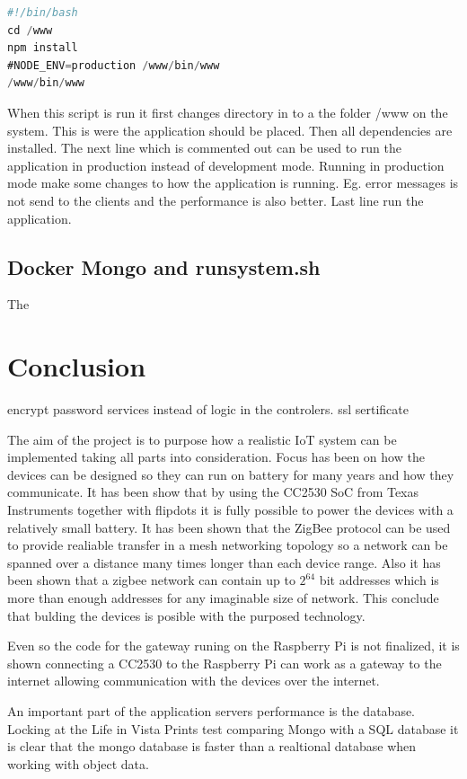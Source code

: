 \documentclass[a4paper,12pt,english]{article}
\begin{document}
\begin{lstlisting}[language=javascript]
#!/bin/bash
cd /www
npm install
#NODE_ENV=production /www/bin/www
/www/bin/www
\end{lstlisting}

When this script is run it first changes directory in to a the folder /www on the system. This is were the application should be placed. Then all dependencies are installed. The next line which is commented out can be used to run the application in production instead of development mode. Running in production mode make some changes to how the application is running. Eg. error messages is not send to the clients and the performance is also better.
Last line run the application.

\subsection{Docker Mongo and runsystem.sh}
The 

\clearpage
\section{Conclusion}
encrypt password
services instead of logic in the controlers.
ssl sertificate

The aim of the project is to purpose how a realistic IoT system can be
implemented taking all parts into consideration. Focus has been on how the
devices can be designed so they can run on battery for many years and how they
communicate. It has been show that by using the CC2530 SoC from Texas
Instruments together with flipdots it is fully possible to power the devices
with a relatively small battery. It has been shown that the ZigBee protocol can
be used to provide realiable transfer in a mesh networking topology so a network
can be spanned over a distance many times longer than each device range. Also it
has been shown that a zigbee network can contain up to $2^{64}$ bit addresses
which is more than enough addresses for any imaginable size of network. This
conclude that bulding the devices is posible with the purposed technology.

Even so the code for the gateway runing on the Raspberry Pi is not finalized, it
is shown connecting a CC2530 to the Raspberry Pi can work as a gateway to
the internet allowing communication with the devices over the internet.

An important part of the application servers performance is the database.
Locking at the Life in Vista Prints test comparing Mongo with a SQL database it
is clear that the mongo database is faster than a realtional database when
working with object data.
\end{document}
